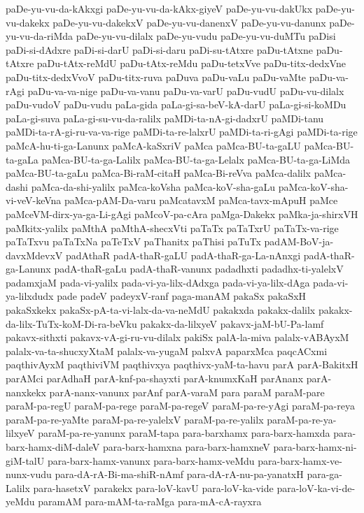 {paDe-yu-vu-da-kAkxgi
paDe-yu-vu-da-kAkx-giyeV
paDe-yu-vu-dakUkx
paDe-yu-vu-dakekx
paDe-yu-vu-dakekxV
paDe-yu-vu-danenxV
paDe-yu-vu-danunx
paDe-yu-vu-da-riMda
paDe-yu-vu-dilalx
paDe-yu-vudu
paDe-yu-vu-duMTu
paDisi
paDi-si-dAdxre
paDi-si-darU
paDi-si-daru
paDi-su-tAtxre
paDu-tAtxne
paDu-tAtxre
paDu-tAtx-reMdU
paDu-tAtx-reMdu
paDu-tetxVve
paDu-titx-dedxVne
paDu-titx-dedxVvoV
paDu-titx-ruva
paDuva
paDu-vaLu
paDu-vaMte
paDu-va-rAgi
paDu-va-va-nige
paDu-va-vanu
paDu-va-varU
paDu-vudU
paDu-vu-dilalx
paDu-vudoV
paDu-vudu
paLa-gida
paLa-gi-sa-beV-kA-darU
paLa-gi-si-koMDu
paLa-gi-suva
paLa-gi-su-vu-da-ralilx
paMDi-ta-nA-gi-dadxrU
paMDi-tanu
paMDi-ta-rA-gi-ru-va-va-rige
paMDi-ta-re-lalxrU
paMDi-ta-ri-gAgi
paMDi-ta-rige
paMcA-hu-ti-ga-Lanunx
paMcA-kaSxriV
paMca
paMca-BU-ta-gaLU
paMca-BU-ta-gaLa
paMca-BU-ta-ga-Lalilx
paMca-BU-ta-ga-Lelalx
paMca-BU-ta-ga-LiMda
paMca-BU-ta-gaLu
paMca-Bi-raM-citaH
paMca-Bi-reVva
paMca-dalilx
paMca-dashi
paMca-da-shi-yalilx
paMca-koVsha
paMca-koV-sha-gaLu
paMca-koV-sha-vi-veV-keVna
paMca-pAM-Da-varu
paMcatavxM
paMca-tavx-mApuH
paMce
paMceVM-dirx-ya-ga-Li-gAgi
paMcoV-pa-cAra
paMga-Dakekx
paMka-ja-shirxVH‌
paMkitx-yalilx
paMthA
paMthA-shecxVti
paTaTx
paTaTxrU
paTaTx-va-rige
paTaTxvu
paTaTx‌Na
paTeTxV
paThanitx
paThisi
paTuTx
padAM-BoV-ja-davxMdevxV
padAthaR
padA-thaR-gaLU
padA-thaR-ga-La-nAnxgi
padA-thaR-ga-Lanunx
padA-thaR-gaLu
padA-thaR-vanunx
padadhxti
padadhx-ti-yalelxV
padamxjaM
pada-vi-yalilx
pada-vi-ya-lilx-dAdxga
pada-vi-ya-lilx-dAga
pada-vi-ya-lilxdudx
pade
padeV
padeyxV-ranf
paga-manAM
pakaSx
pakaSxH
pakaSxkekx
pakaSx-pA-ta-vi-lalx-da-va-neMdU
pakakxda
pakakx-dalilx
pakakx-da-lilx-TuTx-koM-Di-ra-beVku
pakakx-da-lilxyeV
pakavx-jaM-bU-Pa-lamf
pakavx-sithxti
pakavx-vA-gi-ru-vu-dilalx
pakiSx
palA-la-miva
palalx-vABAyxM
palalx-va-ta-shucxyXtaM
palalx-va-yugaM
palxvA
paparxMca
paqcACxmi
paqthivAyxM
paqthiviVM
paqthivxya
paqthivx-yaM-ta-havu
parA
parA-BakitxH
parAMci
parAdhaH
parA-knf-pa-shayxti
parA-knumxKaH
parAnanx
parA-nanxkekx
parA-nanx-vanunx
parAnf
parA-varaM
para
paraM
paraM-pare
paraM-pa-regU
paraM-pa-rege
paraM-pa-regeV
paraM-pa-re-yAgi
paraM-pa-reya
paraM-pa-re-yaMte
paraM-pa-re-yalelxV
paraM-pa-re-yalilx
paraM-pa-re-ya-lilxyeV
paraM-pa-re-yanunx
paraM-tapa
para-barxhamx
para-barx-hamxda
para-barx-hamx-diM-daleV
para-barx-hamxna
para-barx-hamxneV
para-barx-hamx-ni-giM-talU
para-barx-hamx-vanunx
para-barx-hamx-veMdu
para-barx-hamx-ve-nunx-vudu
para-dA-rA-Bi-ma-shiR-nAmf
para-dA-rA-nu-pa-yanatxH
para-ga-Lalilx
para-hasetxV
parakekx
para-loV-kavU
para-loV-ka-vide
para-loV-ka-vi-de-yeMdu
paramAM
para-mAM-ta-raMga
para-mA-cA-rayxra
}
